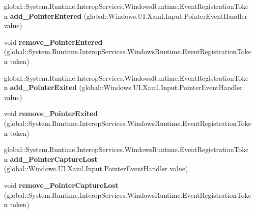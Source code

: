 \begin{DoxyCompactItemize}
\mbox{\label{interface_windows_1_1_u_i_1_1_xaml_1_1_i_u_i_element_a54194f94b331caa84198af8f0147c1f1}} 
global\+::\+System.\+Runtime.\+Interop\+Services.\+Windows\+Runtime.\+Event\+Registration\+Token {\bfseries add\+\_\+\+Pointer\+Entered} (global\+::\+Windows.\+U\+I.\+Xaml.\+Input.\+Pointer\+Event\+Handler value)
\item 
\mbox{\label{interface_windows_1_1_u_i_1_1_xaml_1_1_i_u_i_element_a97fd59b642c8546d197cd5ffebe213bf}} 
void {\bfseries remove\+\_\+\+Pointer\+Entered} (global\+::\+System.\+Runtime.\+Interop\+Services.\+Windows\+Runtime.\+Event\+Registration\+Token token)
\item 
\mbox{\label{interface_windows_1_1_u_i_1_1_xaml_1_1_i_u_i_element_a692d43ef89399af622b349c4c0ac5249}} 
global\+::\+System.\+Runtime.\+Interop\+Services.\+Windows\+Runtime.\+Event\+Registration\+Token {\bfseries add\+\_\+\+Pointer\+Exited} (global\+::\+Windows.\+U\+I.\+Xaml.\+Input.\+Pointer\+Event\+Handler value)
\item 
\mbox{\label{interface_windows_1_1_u_i_1_1_xaml_1_1_i_u_i_element_a934eefa2b5181fd9b0c19d7b6536d6d9}} 
void {\bfseries remove\+\_\+\+Pointer\+Exited} (global\+::\+System.\+Runtime.\+Interop\+Services.\+Windows\+Runtime.\+Event\+Registration\+Token token)
\item 
\mbox{\label{interface_windows_1_1_u_i_1_1_xaml_1_1_i_u_i_element_a4600eed2eadce86aaa8771cc8aedbb0d}} 
global\+::\+System.\+Runtime.\+Interop\+Services.\+Windows\+Runtime.\+Event\+Registration\+Token {\bfseries add\+\_\+\+Pointer\+Capture\+Lost} (global\+::\+Windows.\+U\+I.\+Xaml.\+Input.\+Pointer\+Event\+Handler value)
\item 
\mbox{\label{interface_windows_1_1_u_i_1_1_xaml_1_1_i_u_i_element_a0e8fccaf0e69daa6bc50f43458fa846a}} 
void {\bfseries remove\+\_\+\+Pointer\+Capture\+Lost} (global\+::\+System.\+Runtime.\+Interop\+Services.\+Windows\+Runtime.\+Event\+Registration\+Token token)
\item 

\end{DoxyCompactItemize}
